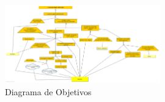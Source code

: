 \begin{figure}[p!hbt]
		\centering
		\includegraphics[angle=90, width=0.6\textwidth]{../img/DO.png}
		\caption{Diagrama de Objetivos }
		\label{fig:Objetivos}
	\end{figure}
